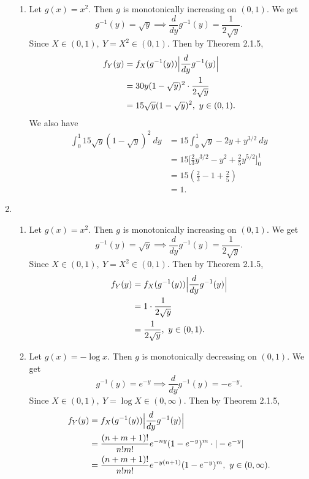 \documentclass{article}
\begin{document}
\begin{enumerate}
\begin{enumerate}
        \item Let $g(x) = x^2$. Then $g$ is monotonically increasing on $(0, 1)$. We get 
        \[
        g^{-1}(y) = \sqrt{y} \implies \frac{d}{dy}g^{-1}(y) = \frac{1}{2\sqrt{y}}.
        \]
        Since $X \in (0, 1), \ Y = X^2 \in (0, 1)$. Then by Theorem 2.1.5, 
        \begin{align*}
            f_{Y}(y) 
            &= f_{X}(g^{-1}(y)) \Bigl|\frac{d}{dy}g^{-1}(y)\Bigr| \\
            &= 30y(1 - \sqrt{y})^2 \cdot \frac{1}{2\sqrt{y}} \\
            &= 15\sqrt{y}(1 - \sqrt{y})^2, \ y \in (0, 1).
        \end{align*}
        We also have 
        \begin{align*}
            \int_{0}^{1} 15\sqrt{y}(1 - \sqrt{y})^2 \ dy
            &= 15 \int_{0}^{1} \sqrt{y} - 2y + y^{3/2} \ dy \\
            &= 15 \Big[ \frac{2}{3}y^{3/2} - y^2 + \frac{2}{5}y^{5/2} \Big]_{0}^{1} \\
            &= 15(\frac{2}{3} - 1 + \frac{2}{5}) \\
            &= 1.
        \end{align*}
        
    \end{enumerate}

    \item 
    \begin{enumerate}
        \item Let $g(x) = x^2$. Then $g$ is monotonically increasing on $(0, 1)$. We get 
        \[
        g^{-1}(y) = \sqrt{y} \implies \frac{d}{dy}g^{-1}(y) = \frac{1}{2\sqrt{y}}.
        \]
        Since $X \in (0, 1), \ Y = X^2 \in (0, 1)$. Then by Theorem 2.1.5,
        \begin{align*}
            f_{Y}(y)
            &= f_{X}(g^{-1}(y)) \Bigl|\frac{d}{dy}g^{-1}(y)\Bigr| \\
            &= 1 \cdot \frac{1}{2\sqrt{y}} \\
            &= \frac{1}{2\sqrt{y}}, \ y \in (0, 1).
        \end{align*}

        \item Let $g(x) = -\log{x}$. Then $g$ is monotonically decreasing on $(0, 1)$. We get 
        \[
        g^{-1}(y) = e^{-y} \implies \frac{d}{dy}g^{-1}(y) = -e^{-y}.
        \]
        Since $X \in (0, 1), \ Y = \log{X} \in (0, \infty)$. Then by Theorem 2.1.5, 
        \begin{align*}
            f_{Y}(y)
            &= f_{X}(g^{-1}(y)) \Bigl|\frac{d}{dy}g^{-1}(y)\Bigr| \\
            &= \frac{(n + m + 1)!}{n!m!}e^{-ny}(1 - e^{-y})^{m} \cdot |-e^{-y}| \\
            &=  \frac{(n + m + 1)!}{n!m!}e^{-y(n + 1)}(1 - e^{-y})^{m}, \ y \in (0, \infty).
        \end{align*}


\end{enumerate}
\end{enumerate}
\end{document}
